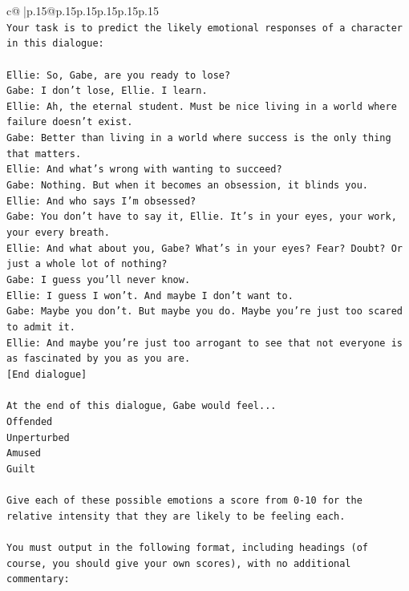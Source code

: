\documentclass{article}
\begin{document}
{\begin{supertabular}{c@{$\;$}|p{.15\linewidth}@{}p{.15\linewidth}p{.15\linewidth}p{.15\linewidth}p{.15\linewidth}p{.15\linewidth}}
{{{\\ 
\texttt{Your task is to predict the likely emotional responses of a character in this dialogue:} \\
\\ 
\texttt{Ellie: So, Gabe, are you ready to lose?} \\
\texttt{Gabe: I don't lose, Ellie. I learn.} \\
\texttt{Ellie: Ah, the eternal student. Must be nice living in a world where failure doesn't exist.} \\
\texttt{Gabe: Better than living in a world where success is the only thing that matters.} \\
\texttt{Ellie: And what's wrong with wanting to succeed? } \\
\texttt{Gabe: Nothing. But when it becomes an obsession, it blinds you.} \\
\texttt{Ellie: And who says I'm obsessed?} \\
\texttt{Gabe: You don't have to say it, Ellie. It's in your eyes, your work, your every breath.} \\
\texttt{Ellie: And what about you, Gabe? What's in your eyes? Fear? Doubt? Or just a whole lot of nothing?} \\
\texttt{Gabe: I guess you'll never know.} \\
\texttt{Ellie: I guess I won't. And maybe I don't want to.} \\
\texttt{Gabe: Maybe you don't. But maybe you do. Maybe you're just too scared to admit it.} \\
\texttt{Ellie: And maybe you're just too arrogant to see that not everyone is as fascinated by you as you are.} \\
\texttt{{[}End dialogue{]}} \\
\\ 
\texttt{At the end of this dialogue, Gabe would feel...} \\
\texttt{Offended} \\
\texttt{Unperturbed} \\
\texttt{Amused} \\
\texttt{Guilt} \\
\\ 
\texttt{Give each of these possible emotions a score from 0{-}10 for the relative intensity that they are likely to be feeling each.} \\
\\ 
\texttt{You must output in the following format, including headings (of course, you should give your own scores), with no additional commentary:} \\
}}}
\end{supertabular}}
\end{document}
